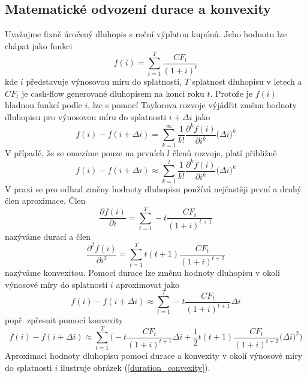 \documentclass[a4paper]{book}
\begin{document}
\subsection{Matematické odvození durace a konvexity}

Uvažujme fixně úročený dluhopis s roční výplatou kupónů. Jeho hodnotu lze chápat jako funkci
\begin{equation*}
f(i) = \sum_{t = 1}^T \frac{CF_t}{(1 + i)^t}
\end{equation*}
kde $i$ představuje výnosovou míru do splatnosti, $T$ splatnost dluhopisu v letech a $CF_t$ je cash-flow generované dluhopisem na konci roku $t$. Protože je $f(i)$ hladnou funkcí podle $i$, lze s pomocí Taylorova rozvoje výjádřit změnu hodnoty dluhopisu pro výnosovou míru do splatnosti $i + \Delta i$ jako
\begin{equation*}
f(i) - f(i + \Delta i) = \sum_{k=1}^{\infty}\frac{1}{k!} \frac{\partial^k f(i)}{\partial i^k} \big( \Delta i \big)^k
\end{equation*}
V případě, že se omezíme pouze na prvních $l$ členů rozvoje, platí přibližně
\begin{equation*}
f(i) - f(i + \Delta i) \approx \sum_{k=1}^{l}\frac{1}{k!} \frac{\partial^k f(i)}{\partial i^k} \big( \Delta i \big)^k
\end{equation*}
V praxi se pro odhad změny hodnoty dluhopisu používá nejčastěji první a druhý člen aproximace. Člen
\begin{equation}
\frac{\partial f(i)}{\partial i} = \sum_{t = 1}^T -t \frac{CF_t}{(1+i)^{t+1}}
\end{equation}
nazýváme durací a člen
\begin{equation}
\frac{\partial^2 f(i)}{\partial i^2} = \sum_{t = 1}^T t (t+1) \frac{CF_t}{(1+i)^{t+2}}
\end{equation}
nazýváme konvexitou. Pomocí durace lze změnu hodnoty dluhopisu v okolí výnosové míry do splatnosti $i$ aproximovat jako
\begin{equation*}
f(i) - f(i + \Delta i) \approx \sum_{t = 1}^T -t \frac{CF_t}{(1+i)^{t+1}} \Delta i
\end{equation*}
popř. zpřesnit pomocí konvexity
\begin{equation*}
f(i) - f(i + \Delta i) \approx \sum_{t = 1}^T \Bigg(- t \frac{CF_t}{(1+i)^{t+1}} \Delta i + \frac{1}{2} t (t+1) \frac{CF_t}{(1+i)^{t+2}} \big( \Delta i \big)^2 \Bigg)
\end{equation*}
Aproximaci hodnoty dluhopisu pomocí durace a konvexity v okolí výnosové míry do splatnosti $i$ ilustruje obrázek (\ref{duration_convexity}).
\end{document}
